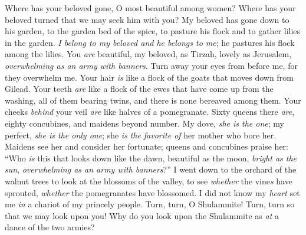 \begin{biblechapter} %
\verse Where has your beloved gone, 
O most beautiful among women? 
Where has your beloved turned 
that we may seek him with you?
\verse My beloved has gone down to his garden, 
to the garden bed of the spice, 
to pasture his flock and to gather lilies in the garden.
 \textit{I belong to my beloved and he belongs to me}; 
he pastures his flock among the lilies.
 You \textit{are} beautiful, my beloved, as Tirzah, 
lovely as Jerusalem, 
\textit{overwhelming as an army with banners}.
\verse Turn away your eyes from before me, 
for they overwhelm me. 
Your hair \textit{is} like a flock of the goats 
that moves down from Gilead.
\verse Your teeth \textit{are} like a flock of the ewes 
that have come up from the washing, 
all of them bearing twins, 
and there is none bereaved among them.
\verse Your cheeks \textit{behind} your veil 
\textit{are} like halves of a pomegranate.
 Sixty queens there \textit{are}, eighty concubines, 
and maidens beyond number.
\verse My dove, \textit{she is the one}; 
my perfect, \textit{she is the only one}; 
she \textit{is} \textit{the favorite of} her mother who bore her. 
Maidens see her and consider her fortunate; 
queens and concubines praise her:
\verse “Who \textit{is} this that looks down like the dawn, 
beautiful as the moon, 
\textit{bright as the sun}, 
\textit{overwhelming as an army with banners}?”
 I went down to the orchard of the walnut trees 
to look at the blossoms of the valley, 
to see \textit{whether} the vine\textit{s} have sprouted, 
\textit{whether} the pomegranates have blossomed.
\verse I did not know my \textit{heart} set me 
\textit{in} a chariot of my princely people.
\verse  Turn, turn, O Shulammite! 
Turn, turn so that we may look upon you! 
Why do you look upon the Shulammite 
as \textit{at} a dance of the two armies?
\end{biblechapter}

